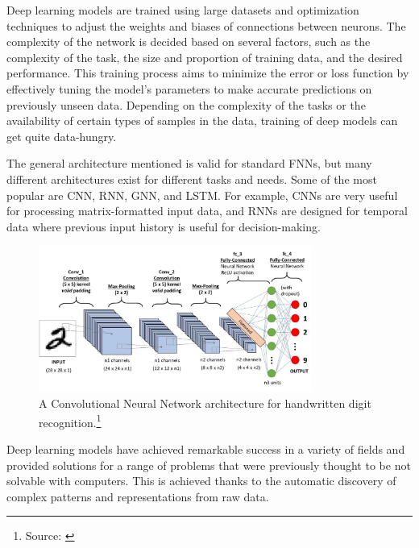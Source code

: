 Deep learning models are trained using large datasets and optimization techniques to adjust the weights and biases of connections between neurons. The complexity of the network is decided based on several factors, such as the complexity of the task, the size and proportion of training data, and the desired performance. This training process aims to minimize the error or loss function by effectively tuning the model's parameters to make accurate predictions on previously unseen data. Depending on the complexity of the tasks or the availability of certain types of samples in the data, training of deep models can get quite data-hungry.

The general architecture mentioned is valid for standard \ac{FNN}s, but many different architectures exist for different tasks and needs. Some of the most popular are \ac{CNN}, \ac{RNN}, \ac{GNN}, and \ac{LSTM}. For example, \ac{CNN}s are very useful for processing matrix-formatted input data, and \ac{RNN}s are designed for temporal data where previous input history is useful for decision-making.

\begin{figure}[ht]
    \begin{minipage}{\textwidth}
        \centering
        \includegraphics[width=0.8\textwidth]{img/cnn.png}
        \caption[A Convolutional Neural Network architecture for handwritten digit recognition.]{A Convolutional Neural Network architecture for handwritten digit recognition.\footnote{Source: \cite{CNNimg}}}
        \label{fig:cnn}
    \end{minipage}
\end{figure}

Deep learning models have achieved remarkable success in a variety of fields and provided solutions for a range of problems that were previously thought to be not solvable with computers. This is achieved thanks to the automatic discovery of complex patterns and representations from raw data.

